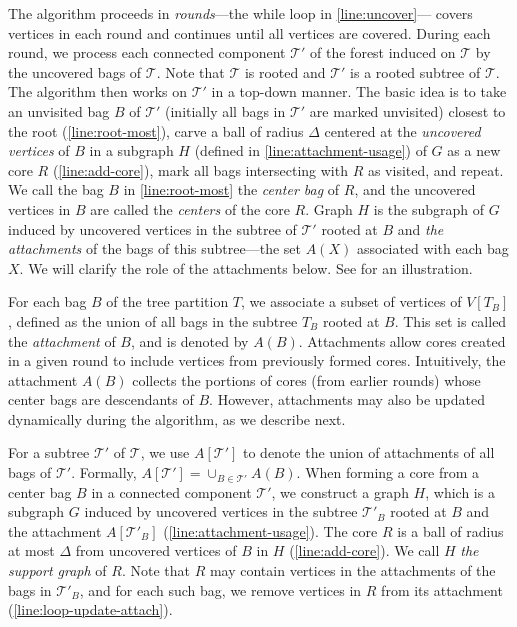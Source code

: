 \documentclass{article}
\newcommand{\mt}{\mathcal{T}}
\begin{document}
The algorithm proceeds in \emph{rounds}---the while loop in \cref{line:uncover}--- covers vertices in each round and continues until all vertices are covered. During each round, we process each connected component $\mt'$ of the forest induced on $\mathcal{T}$ by the uncovered bags of $\mathcal{T}$. Note that $\mt$ is rooted and  $\mt'$ is a rooted subtree of $\mathcal{T}$. The algorithm then works on $\mt'$ in a top-down manner. The basic idea is to take an unvisited bag $B$ of $\mathcal{T}'$ (initially all bags in $\mt'$ are marked unvisited) closest to the root (\cref{line:root-most}), carve a ball of radius $\Delta$ centered at the \emph{uncovered vertices} of $B$ in a subgraph $H$ (defined in \cref{line:attachment-usage}) of $G$ as a new core $R$ (\cref{line:add-core}), mark all bags intersecting with $R$ as visited, and repeat.  We call the bag $B$ in \cref{line:root-most} the \emph{center bag} of $R$, and the uncovered vertices in $B$ are called the \emph{centers} of the core $R$. Graph $H$ is the subgraph of $G$ induced by uncovered vertices in the subtree of $\mt'$ rooted at $B$ and \emph{the attachments} of the bags of this subtree---the set $A(X)$ associated with each bag $X$. We will clarify the role of the attachments below. See  for an illustration. 

For each bag $B$ of the tree partition $T$, we associate a subset of vertices of $V[T_B]$, defined as the union of all bags in the subtree $T_B$ rooted at $B$. This set is called the \emph{attachment} of $B$, and is denoted by $A(B)$. Attachments allow cores created in a given round to include vertices from previously formed cores. Intuitively, the attachment $A(B)$ collects the portions of cores (from earlier rounds) whose center bags are descendants of $B$. However, attachments may also be updated dynamically during the algorithm, as we describe next.

For a subtree $\mt'$ of $\mathcal{T}$, we use $A[\mt']$ to denote the union of attachments of all bags of $\mt'$. Formally, $A[\mt'] = \cup_{B\in \mt'}A(B)$. When forming a core from a center bag $B$ in a connected component $\mt'$,  we construct a graph $H$, which is a subgraph $G$ induced by uncovered vertices in the subtree $\mt'_B$ rooted at $B$ and the attachment $A[\mt'_B]$ (\cref{line:attachment-usage}).  The core $R$ is a ball of radius at most $\Delta$ from uncovered vertices of $B$ in $H$ (\cref{line:add-core}).  We call $H$ \emph{the support graph} of $R$. Note that $R$ may contain vertices in the attachments of the bags in $\mt'_B$, and for each such bag, we remove vertices in $R$ from its attachment (\cref{line:loop-update-attach}). 
\end{document}
